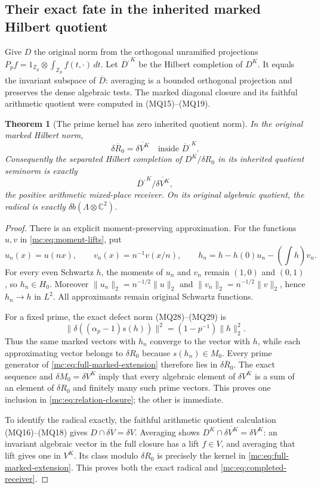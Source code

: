 \documentclass[11pt,a4paper]{article}
\newtheorem{theorem}{Theorem}[section]
\theoremstyle{definition}\newtheorem{definition}[theorem]{Definition}
\newcommand{\Z}{\mathbb Z}\newcommand{\Q}{\mathbb Q}
\newcommand{\C}{\mathbb C}\newcommand{\R}{\mathbb R}
\begin{document}
\subsection{Their exact fate in the inherited marked Hilbert quotient}

Give $D$ the original norm from the orthogonal unramified
projections
$P_pf=1_{\Z_p}\otimes\int_{\Z_p}f(t,\cdot)\,dt$.
Let $\overline D^{,K}$ be the Hilbert completion of $D^K$.
It equals the invariant subspace of $\overline D$: averaging is
a bounded orthogonal projection and preserves the dense algebraic
tests. The marked diagonal closure and its faithful arithmetic
quotient were computed in (MQ15)--(MQ19).

\begin{theorem}[The prime kernel has zero inherited quotient norm]
\label{mc:thm:closure-relations}
In the original marked Hilbert norm,
\[
 \overline{\delta R_0}=\overline{\delta V^K}
          \quad\text{inside }\overline D^{,K}.
 \tag{MC22}\label{mc:eq:relation-closure}
\]
Consequently the separated Hilbert completion of
$D^K/\delta R_0$ in its inherited quotient seminorm is exactly
\[
 \overline D^{,K}/\overline{\delta V^K},
 \tag{MC23}\label{mc:eq:completed-receiver}
\]
the positive arithmetic mixed-place receiver. On its original
algebraic quotient, the radical is exactly
$\delta b(\Lambda\otimes\C^2)$.
\end{theorem}
\begin{proof}
There is an explicit moment-preserving approximation. For the
functions $u,v$ in \eqref{mc:eq:moment-lifts}, put
\[
 u_n(x)=u(nx),\qquad v_n(x)=n^{-1}v(x/n),\qquad
 h_n=h-h(0)u_n-\left(\int h\right)v_n.
 \tag{MC24}\label{mc:eq:moment-approximation}
\]
For every even Schwartz $h$, the moments of $u_n$ and $v_n$
remain $(1,0)$ and $(0,1)$, so $h_n\in H_0$. Moreover
$\|u_n\|_2=n^{-1/2}\|u\|_2$ and
$\|v_n\|_2=n^{-1/2}\|v\|_2$, hence $h_n\to h$ in $L^2$.
All approximants remain original Schwartz functions.

For a fixed prime, the exact defect norm (MQ28)--(MQ29) is
\[
 \bigl\|\delta((\alpha_p-1)s(h))\bigr\|^2
                   =(1-p^{-1})\|h\|_2^2.
 \tag{MC25}\label{mc:eq:boundary-norm}
\]
Thus the same marked vectors with $h_n$ converge to the vector
with $h$, while each approximating vector belongs to $\delta R_0$
because $s(h_n)\in M_0$. Every prime generator of
\eqref{mc:eq:full-marked-extension} therefore lies in
$\overline{\delta R_0}$. The exact sequence and
$\delta M_0=\delta V^K$ imply that every algebraic element of
$\delta V^K$ is a sum of an element of $\delta R_0$ and
finitely many such prime vectors. This proves one inclusion in
\eqref{mc:eq:relation-closure}; the other is immediate.

To identify the radical exactly, the faithful arithmetic quotient
calculation (MQ16)--(MQ18) gives
$D\cap\overline{\delta V}=\delta V$. Averaging shows
$D^K\cap\overline{\delta V^K}=\delta V^K$: an invariant
algebraic vector in the full closure has a lift $f\in V$, and
averaging that lift gives one in $V^K$. Its class modulo
$\delta R_0$ is precisely the kernel in
\eqref{mc:eq:full-marked-extension}. This proves both the exact
radical and \eqref{mc:eq:completed-receiver}.
\end{proof}
\end{document}
